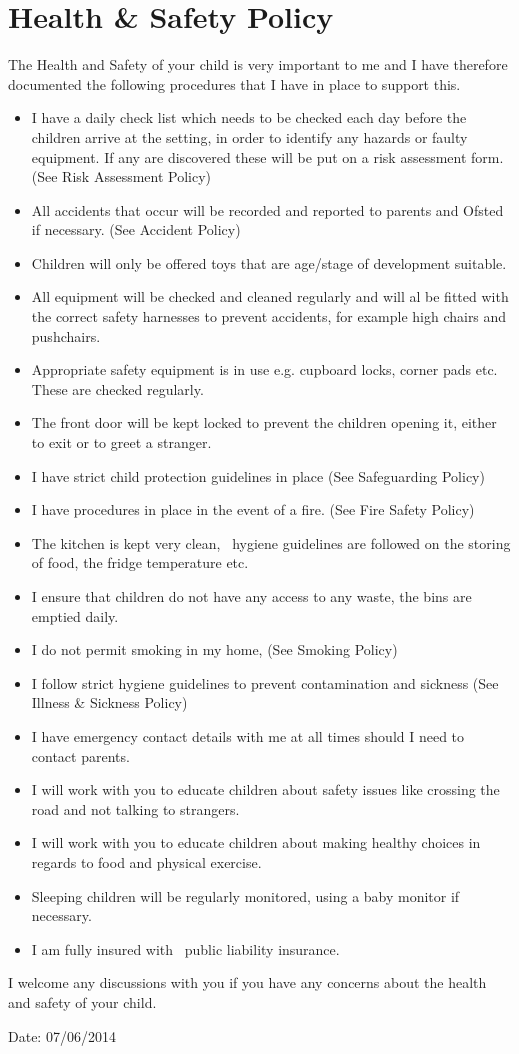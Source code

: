 
\section{Health \& Safety Policy}

The Health and Safety of your child is very important to me and I have
therefore documented the following procedures that I have in place to
support this.

\begin{itemize}
\item
  I have a daily check list which needs to be checked each day before
  the children arrive at the setting, in order to identify any hazards
  or faulty equipment. If any are discovered these will be put on a risk
  assessment form. (See Risk Assessment Policy)
\item
  All accidents that occur will be recorded and reported to parents and
  Ofsted if necessary. (See Accident Policy)
\item
  Children will only be offered toys that are age/stage of development
  suitable.
\item
  All equipment will be checked and cleaned regularly and will al be
  fitted with the correct safety harnesses to prevent accidents, for
  example high chairs and pushchairs.
\item
  Appropriate safety equipment is in use e.g. cupboard locks, corner
  pads etc. These are checked regularly.
\item
  The front door will be kept locked to prevent the children opening
  it, either to exit or to greet a stranger.
\item
  I have strict child protection guidelines in place (See Safeguarding
  Policy)
\item
  I have procedures in place in the event of a fire. (See Fire Safety
  Policy)
\item
  The kitchen is kept very clean, ~hygiene guidelines are followed on
  the storing of food, the fridge temperature etc.
\item
  I ensure that children do not have any access to any waste, the bins
  are emptied daily.
\item
  I do not permit smoking in my home, (See Smoking Policy)
\item
  I follow strict hygiene guidelines to prevent contamination and
  sickness (See Illness \& Sickness Policy)
\item
  I have emergency contact details with me at all times should I need
  to contact parents.
\item
  I will work with you to educate children about safety issues like
  crossing the road and not talking to strangers.
\item
  I will work with you to educate children about making healthy choices
  in regards to food and physical exercise.
\item
  Sleeping children will be regularly monitored, using a baby monitor
  if necessary.
\item
  I am fully insured with ~public liability insurance.
\end{itemize}

I welcome any discussions with you if you have any concerns about the
health and safety of your child.

Date: 07/06/2014


